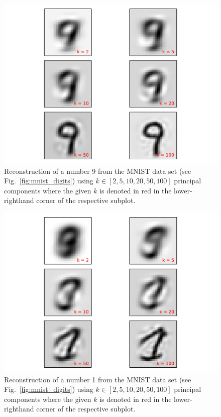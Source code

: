 \documentclass[12pt]{amsart}
\begin{document}
\begin{figure}[H]
	\includegraphics[width=\columnwidth]{9_recon_mnist.pdf}
    \caption{Reconstruction of a number 9 from the MNIST data set (see Fig.~\ref{fig:mnist_digits}) using $k \in [2,5,10,20,50,100]$ principal components where the given $k$ is denoted in red in the lower-righthand corner of the respective subplot.}
    \label{fig:recon_9}
\end{figure}
\begin{figure}[H]
	\includegraphics[width=\columnwidth]{1_recon_mnist.pdf}
    \caption{Reconstruction of a number 1 from the MNIST data set (see Fig.~\ref{fig:mnist_digits}) using $k \in [2,5,10,20,50,100]$ principal components where the given $k$ is denoted in red in the lower-righthand corner of the respective subplot.}
    \label{fig:recon_1}
\end{figure}
\end{document}
